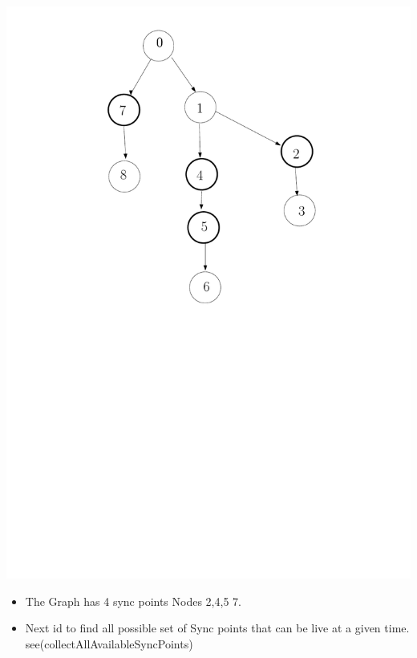 \documentclass[12pt]{beamer}
\begin{document}
\begin{frame}[plain]
  \includegraphics[scale=0.3]{syncpoints.pdf}
  \begin{itemize}
  \item The Graph has 4 sync points Nodes 2,4,5 7.
  \item Next id to find all possible set of Sync points that can be live at a given time.
    see(collectAllAvailableSyncPoints)
  \end{itemize}
\end{frame}
\end{document}
